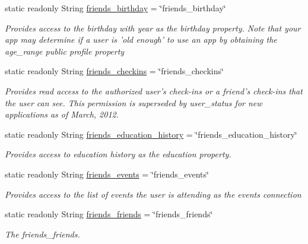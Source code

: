 \begin{DoxyCompactItemize}
static readonly String \hyperlink{classcom_1_1shephertz_1_1app42_1_1paas_1_1sdk_1_1csharp_1_1social_1_1_f_b_perms_a1db8ae438b466e02d556ac1f0664f71c}{friends\+\_\+birthday} = \char`\"{}friends\+\_\+birthday\char`\"{}
\begin{DoxyCompactList}\small\item\em Provides access to the birthday with year as the birthday property. Note that your app may determine if a user is 'old enough' to use an app by obtaining the age\+\_\+range public profile property \end{DoxyCompactList}\item 
static readonly String \hyperlink{classcom_1_1shephertz_1_1app42_1_1paas_1_1sdk_1_1csharp_1_1social_1_1_f_b_perms_aa35b26ec4f03ffe9ebd94305f5db03e8}{friends\+\_\+checkins} = \char`\"{}friends\+\_\+checkins\char`\"{}
\begin{DoxyCompactList}\small\item\em Provides read access to the authorized user's check-\/ins or a friend's check-\/ins that the user can see. This permission is superseded by user\+\_\+status for new applications as of March, 2012. \end{DoxyCompactList}\item 
static readonly String \hyperlink{classcom_1_1shephertz_1_1app42_1_1paas_1_1sdk_1_1csharp_1_1social_1_1_f_b_perms_a1f7b6fd10abcb6b35c0d3f8a1ca8af48}{friends\+\_\+education\+\_\+history} = \char`\"{}friends\+\_\+education\+\_\+history\char`\"{}
\begin{DoxyCompactList}\small\item\em Provides access to education history as the education property. \end{DoxyCompactList}\item 
static readonly String \hyperlink{classcom_1_1shephertz_1_1app42_1_1paas_1_1sdk_1_1csharp_1_1social_1_1_f_b_perms_aa0d59d1b7a97df12abd9f637dc130ebe}{friends\+\_\+events} = \char`\"{}friends\+\_\+events\char`\"{}
\begin{DoxyCompactList}\small\item\em Provides access to the list of events the user is attending as the events connection \end{DoxyCompactList}\item 
static readonly String \hyperlink{classcom_1_1shephertz_1_1app42_1_1paas_1_1sdk_1_1csharp_1_1social_1_1_f_b_perms_a9b92fd270d38dbcf66b85778f2550103}{friends\+\_\+friends} = \char`\"{}friends\+\_\+friends\char`\"{}
\begin{DoxyCompactList}\small\item\em The friends\+\_\+friends. \end{DoxyCompactList}\item 

\end{DoxyCompactItemize}
